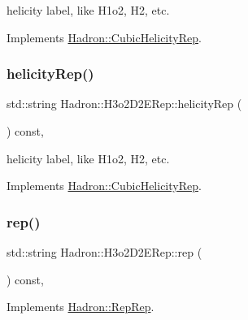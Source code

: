 helicity label, like H1o2, H2, etc. 

Implements \mbox{\hyperlink{structHadron_1_1CubicHelicityRep_af1096946b7470edf0a55451cc662f231}{Hadron\+::\+Cubic\+Helicity\+Rep}}.

\mbox{\label{structHadron_1_1H3o2D2ERep_ad3100dd02c2f3ec837e4d589a732d956}} 
\subsubsection{\texorpdfstring{helicityRep()}{helicityRep()}\hspace{0.1cm}{\footnotesize\ttfamily [2/2]}}
{\footnotesize\ttfamily std\+::string Hadron\+::\+H3o2\+D2\+E\+Rep\+::helicity\+Rep (\begin{DoxyParamCaption}{ }\end{DoxyParamCaption}) const\hspace{0.3cm}{\ttfamily [inline]}, {\ttfamily [virtual]}}

helicity label, like H1o2, H2, etc. 

Implements \mbox{\hyperlink{structHadron_1_1CubicHelicityRep_af1096946b7470edf0a55451cc662f231}{Hadron\+::\+Cubic\+Helicity\+Rep}}.

\mbox{\label{structHadron_1_1H3o2D2ERep_a62c37bd67dbe2ba7fd36b57f0a069aa7}} 
\subsubsection{\texorpdfstring{rep()}{rep()}\hspace{0.1cm}{\footnotesize\ttfamily [1/3]}}
{\footnotesize\ttfamily std\+::string Hadron\+::\+H3o2\+D2\+E\+Rep\+::rep (\begin{DoxyParamCaption}{ }\end{DoxyParamCaption}) const\hspace{0.3cm}{\ttfamily [inline]}, {\ttfamily [virtual]}}



Implements \mbox{\hyperlink{structHadron_1_1RepRep_ab3213025f6de249f7095892109575fde}{Hadron\+::\+Rep\+Rep}}.

\mbox{\label{structHadron_1_1H3o2D2ERep_a62c37bd67dbe2ba7fd36b57f0a069aa7}} 
